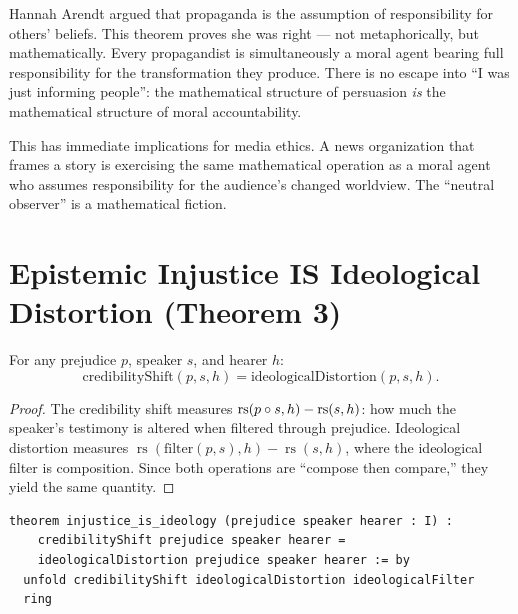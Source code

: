 \begin{interpretation}
Hannah Arendt argued that propaganda is the assumption of responsibility for others' beliefs.  This theorem proves she was right --- not metaphorically, but mathematically.  Every propagandist is simultaneously a moral agent bearing full responsibility for the transformation they produce.  There is no escape into ``I was just informing people'': the mathematical structure of persuasion \emph{is} the mathematical structure of moral accountability.

This has immediate implications for media ethics.  A news organization that frames a story is exercising the same mathematical operation as a moral agent who assumes responsibility for the audience's changed worldview.  The ``neutral observer'' is a mathematical fiction.
\end{interpretation}


\section{Epistemic Injustice IS Ideological Distortion (Theorem 3)}

\begin{theorem}
\label{thm:injustice-ideology}
For any prejudice $p$, speaker $s$, and hearer $h$:
\[
\text{credibilityShift}(p, s, h) = \text{ideologicalDistortion}(p, s, h).
\]
\end{theorem}

\begin{proof}
The credibility shift measures $\operatorname{rs}(p \circ s, h) - \operatorname{rs}(s, h)$: how much the speaker's testimony is altered when filtered through prejudice.  Ideological distortion measures $\operatorname{rs}(\text{filter}(p, s), h) - \operatorname{rs}(s, h)$, where the ideological filter is composition.  Since both operations are ``compose then compare,'' they yield the same quantity.
\end{proof}

\begin{lstlisting}
theorem injustice_is_ideology (prejudice speaker hearer : I) :
    credibilityShift prejudice speaker hearer =
    ideologicalDistortion prejudice speaker hearer := by
  unfold credibilityShift ideologicalDistortion ideologicalFilter
  ring
\end{lstlisting}

